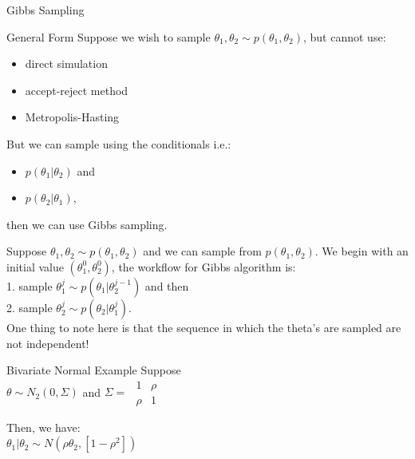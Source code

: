 \documentclass{beamer}
\begin{document}
\begin{section}{Gibbs Sampling}
    \begin{frame}{General Form}
        Suppose we wish to sample $\theta_1, \theta_2 \sim p(\theta_1, \theta_2)$, but cannot use:\\
        \begin{itemize}
            \item direct simulation
            \item accept-reject method
            \item Metropolis-Hasting
        \end{itemize}
        But we can sample using the conditionals i.e.:\\
        \begin{itemize}
            \item $p(\theta_1|\theta_2)$ and
            \item $p(\theta_2|\theta_1)$,
        \end{itemize}
        then we can use Gibbs sampling.
    \end{frame}
    
    \begin{frame}
        Suppose $\theta_1, \theta_2 \sim p(\theta_1, \theta_2)$ and we can sample from $p(\theta_1, \theta_2)$. We begin with an initial value $(\theta_1^{0}, \theta_2^{0})$, the workflow for Gibbs algorithm is:\\
        1. sample $\theta_1^j \sim p(\theta_1|\theta_2^{j-1})$ and then\\
        2. sample $\theta_2^j \sim p(\theta_2|\theta_1^j)$.\\
        One thing to note here is that the sequence in which the theta's are sampled are not independent!    
    \end{frame}

    \begin{frame}{Bivariate Normal Example}
        Suppose \\
        $\theta \sim N_2(0,\Sigma)$ and $\Sigma = $
        $ \begin{matrix}
        1 & \rho \\
        \rho & 1  
        \end{matrix} $
    
    Then, we have:\\
    $\theta_1|\theta_2 \sim N(\rho\theta_2,[1-\rho^2])$


\end{frame}
\end{section}
\end{document}
